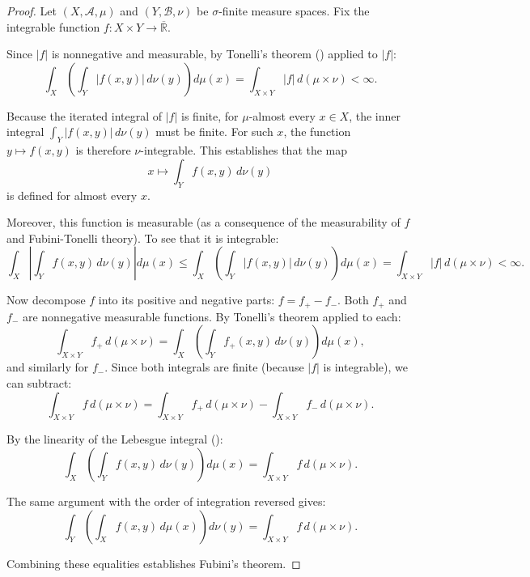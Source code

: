 \begin{proof}
    Let $(X, \mathcal{A}, \mu)$ and $(Y, \mathcal{B}, \nu)$ be $\sigma$-finite measure spaces. Fix the integrable function $f : X \times Y \to \overline{\mathbb{R}}$.

    Since $|f|$ is nonnegative and measurable, by Tonelli's theorem () applied to $|f|$:
    $$\int_X \left(\int_Y |f(x,y)|\,d\nu(y)\right) d\mu(x) = \int_{X \times Y} |f|\,d(\mu \times \nu) < \infty.$$

    Because the iterated integral of $|f|$ is finite, for $\mu$-almost every $x \in X$, the inner integral $\int_Y |f(x,y)|\,d\nu(y)$ must be finite. For such $x$, the function $y \mapsto f(x,y)$ is therefore $\nu$-integrable. This establishes that the map
    $$x \mapsto \int_Y f(x,y)\,d\nu(y)$$
    is defined for almost every $x$.

    Moreover, this function is measurable (as a consequence of the measurability of $f$ and Fubini-Tonelli theory). To see that it is integrable:
    $$\int_X \left|\int_Y f(x,y)\,d\nu(y)\right| d\mu(x) \leq \int_X \left(\int_Y |f(x,y)|\,d\nu(y)\right) d\mu(x) = \int_{X \times Y} |f|\,d(\mu \times \nu) < \infty.$$

    Now decompose $f$ into its positive and negative parts: $f = f_+ - f_-$. Both $f_+$ and $f_-$ are nonnegative measurable functions. By Tonelli's theorem applied to each:
    $$\int_{X \times Y} f_+\,d(\mu \times \nu) = \int_X \left(\int_Y f_+(x,y)\,d\nu(y)\right) d\mu(x),$$
    and similarly for $f_-$. Since both integrals are finite (because $|f|$ is integrable), we can subtract:
    $$\int_{X \times Y} f\,d(\mu \times \nu) = \int_{X \times Y} f_+\,d(\mu \times \nu) - \int_{X \times Y} f_-\,d(\mu \times \nu).$$

    By the linearity of the Lebesgue integral ():
    $$\int_X \left(\int_Y f(x,y)\,d\nu(y)\right) d\mu(x) = \int_{X \times Y} f\,d(\mu \times \nu).$$

    The same argument with the order of integration reversed gives:
    $$\int_Y \left(\int_X f(x,y)\,d\mu(x)\right) d\nu(y) = \int_{X \times Y} f\,d(\mu \times \nu).$$

    Combining these equalities establishes Fubini's theorem.
\end{proof}
